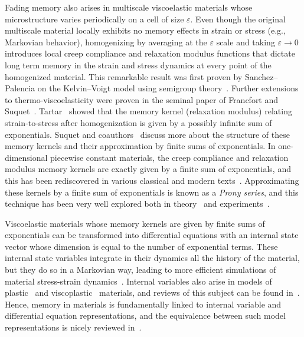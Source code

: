 Fading memory also arises in multiscale viscoelastic materials whose microstructure varies periodically on a cell of size $\varepsilon$. Even though the original multiscale material locally exhibits no memory effects in strain or stress (e.g., Markovian behavior), homogenizing by averaging at the $\varepsilon$ scale and taking $\varepsilon \to 0$ introduces local creep compliance and relaxation modulus functions that dictate long term memory in the strain and stress dynamics at every point of the homogenized material. This remarkable result was first proven by Sanchez--Palencia on the Kelvin--Voigt model using semigroup theory~\cite[Chapter 6]{sanchez1980non}. Further extensions to thermo-viscoelasticity were proven in the seminal paper of Francfort and Suquet~\cite{francfort1986homogenization}. Tartar~\cite{tartar1991memory} showed that the memory kernel (relaxation modulus) relating strain-to-stress after homogenization is given by a possibly infinite sum of exponentials. Suquet and coauthors~\cite{brenner2013overall, lahellec2024effective, lahellec2024effective2} discuss more about the structure of these memory kernels and their approximation by finite sums of exponentials. In one-dimensional piecewise constant materials, the creep compliance and relaxation modulus memory kernels are exactly given by a finite sum of exponentials, and this has been rediscovered in various classical and modern texts~\cite{gross1968mathematical, bhattacharya2023learning}. Approximating these kernels by a finite sum of exponentials is known as a \textit{Prony series}, and this technique has been very well explored both in theory~\cite{lahellec2024effective, serra2019viscoelastic, tschoegl2012phenomenological} and experiments~\cite{kim2024experimental, kraus2017parameter, nikonov2005determination, shanbhag2023computer}.

Viscoelastic materials whose memory kernels are given by finite sums of exponentials can be transformed into differential equations with an internal state vector whose dimension is equal to the number of exponential terms. These internal state variables integrate in their dynamics all the history of the material, but they do so in a Markovian way, leading to more efficient simulations of material stress-strain dynamics~\cite{bhattacharya2023learning, liu2023learning}. Internal variables also arise in models of plastic~\cite{rice1971inelastic} and viscoplastic~\cite{liu2023learning} materials, and reviews of this subject can be found in~\cite{billington1982physics, horstemeyer2010historical}. Hence, memory in materials is fundamentally linked to internal variable and differential equation representations, and the equivalence between such model representations is nicely reviewed in~\cite{eggersmann2019model}.~\\

